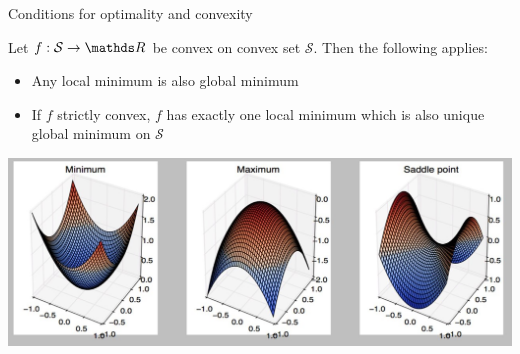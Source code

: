 \documentclass[11pt,compress,t,notes=noshow, xcolor=table]{beamer}
\begin{document}
\begin{vbframe}{Conditions for optimality and convexity}

Let $f:\mathcal{S} \to \R$ be convex on convex set $\mathcal{S}$. Then the following applies:

\begin{itemize}
\item Any local minimum is also global minimum 
\item If $f$ strictly convex, $f$ has exactly one local minimum which is also unique global minimum on $\mathcal{S}$
\end{itemize}

\begin{center}
\includegraphics[scale= 0.5]{figure_man/convex.jpg}
\end{center}


\end{vbframe}


  \endlecture
  
\end{document}
